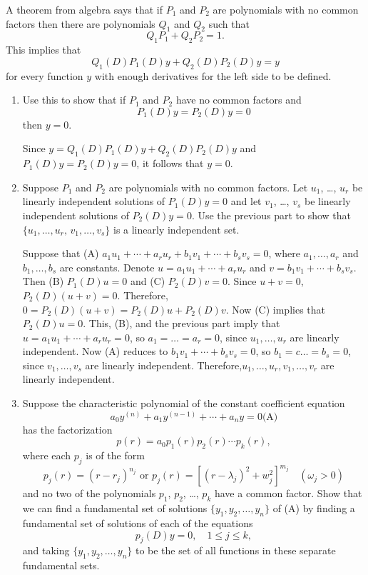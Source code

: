 \documentclass{ximera}
\begin{document}
\begin{problem}\label{exer:9.2.40}
A theorem from algebra says that if $P_1$ and $P_2$ are polynomials
with no common factors then there are polynomials $Q_1$ and $Q_2$
such that
$$
Q_1P_1+Q_2P_2=1.
$$
This implies that
$$
Q_1(D)P_1(D)y+Q_2(D)P_2(D)y=y
$$
for every function $y$ with enough derivatives for the left side to be
defined.

\begin{enumerate}
\item %
Use this to show that if $P_1$ and $P_2$ have no common factors and
$$
P_1(D)y=P_2(D)y=0
$$
then $y=0$.

\begin{solution}
Since $y=Q_1(D)P_1(D)y+Q_2(D)P_2(D)y$ and $P_1(D)y=P_2(D)y=0$, it
follows that $y=0$.
\end{solution}

\item %
Suppose $P_1$ and $P_2$ are polynomials with no common factors.
Let $u_1$, \dots, $u_r$ be linearly independent solutions of $P_1(D)y=0$
and let $v_1$, \dots, $v_s$ be linearly independent solutions of
$P_2(D)y=0$. Use the previous part to show that $\{u_1,\dots,u_r,\,
v_1,\dots,v_s\}$ is a linearly independent set.

\begin{solution}
Suppose that
(A) $a_1u_1+\cdots+a_ru_r+b_1v_1+\cdots+b_sv_s=0$,
where $a_1,\dots,a_r$ and $b_1,\dots,b_s$ are constants. Denote
$u=a_1u_1+\cdots+a_ru_r$ and $v=b_1v_1+\cdots+b_sv_s$. Then
(B) $P_1(D)u=0$ and (C) $P_2(D)v=0$. Since $u+v=0$, $P_2(D)(u+v)=0$.
Therefore,$0=P_2(D)(u+v)=P_2(D)u+P_2(D)v$. Now (C) implies that
$P_2(D)u=0$. This, (B), and the previous part imply that
$u=a_1u_1+\cdots+a_ru_r=0$, so $a_1=\dots=a_r=0$, since
$u_1,\dots,u_r$ are linearly independent. Now (A) reduces to
$b_1v_1+\cdots+b_sv_s=0$,
 so $b_1=c\dots=b_s=0$, since
$v_1,\dots,v_s$ are linearly independent.
Therefore,$u_1,\dots,u_r,
v_1,\dots,v_r$ are linearly independent.
\end{solution}

\item %
Suppose the characteristic polynomial of the constant coefficient
equation
$$
a_0y^{(n)}+a_1y^{(n-1)}+\cdots+a_ny=0
\text{(A)}
$$
has the factorization
$$
p(r)=a_0p_1(r)p_2(r)\cdots p_k(r),
$$
where each $p_j$ is of the form
$$
p_j(r)=(r-r_j)^{n_j} \mbox{ or }
p_j(r)=[(r-\lambda_j)^2+w^2_j]^{m_j}\quad  (\omega_j>0)
$$
and no two of the polynomials $p_1$, $p_2$, \dots, $p_k$ have a common
factor. Show that we can find a fundamental set of solutions
$\{y_1,y_2,\dots,y_n\}$ of (A) by finding a
fundamental set of solutions of each of the equations
$$
p_j(D)y=0,\quad 1\le j\le k,
$$
 and taking $\{y_1,y_2,\dots,y_n\}$ to be the set of all
functions in these separate fundamental sets.


\end{enumerate}
\end{problem}
\end{document}
